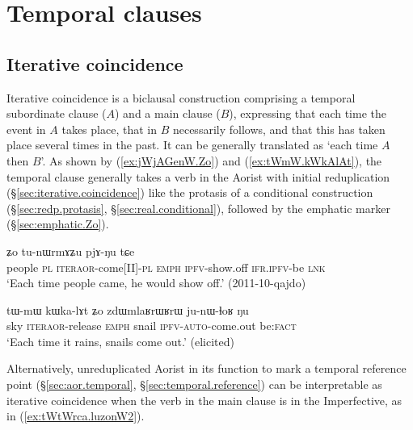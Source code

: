   
 
 \section{Temporal clauses} \label{sec:temporal.clauses}

 

 \subsection{Iterative coincidence} \label{sec:iterative.coincidence.clause}
Iterative coincidence is a biclausal construction comprising a temporal subordinate clause ($A$) and a main clause ($B$), expressing that each time the event in $A$ takes place, that in $B$ necessarily follows, and that this has taken place several times in the past. It can be generally translated as `each time $A$ then $B$'. As shown by (\ref{ex:jWjAGenW.Zo}) and (\ref{ex:tWmW.kWkAlAt}), the temporal clause generally takes a verb in the Aorist with initial reduplication (§\ref{sec:iterative.coincidence}) like the protasis of a conditional construction (§\ref{sec:redp.protasis}, §\ref{sec:real.conditional}), followed by the emphatic marker  (§\ref{sec:emphatic.Zo}).

 
\begin{exe}
\ex \label{ex:jWjAGenW.Zo}
 ʑo tu-nɯrmɤʑu pjɤ-ŋu tɕe \\
people \textsc{pl}  \textsc{iter}\redp{}\textsc{aor}-come[II]-\textsc{pl} \textsc{emph} \textsc{ipfv}-show.off \textsc{ifr}.\textsc{ipfv}-be \textsc{lnk} \\
\glt `Each time people came, he would show off.' (2011-10-qajdo)
\end{exe}

\begin{exe}
   \ex \label{ex:tWmW.kWkAlAt}
   \gll  tɯ-mɯ  kɯ\redp{}ka-lɤt ʑo zdɯmlaʁrɯʁrɯ ju-nɯ-ɬoʁ ŋu   \\
sky \textsc{iter}\redp{}\textsc{aor}-release \textsc{emph} snail \textsc{ipfv}-\textsc{auto}-come.out be:\textsc{fact} \\
\glt `Each time it rains,  snails come out.' (elicited)
\end{exe}

Alternatively, unreduplicated Aorist in its function to mark a temporal reference point (§\ref{sec:aor.temporal}, §\ref{sec:temporal.reference}) can be interpretable as  iterative coincidence when the verb in the main clause is in the Imperfective, as in (\ref{ex:tWtWrca.luzonW2}). 

